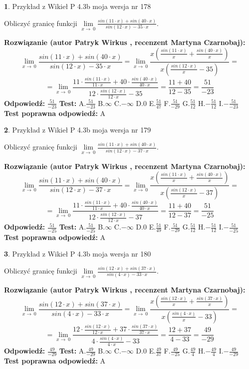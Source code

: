\documentclass[12pt, a4paper]{article}
\theoremstyle{definition} %
\newtheorem{zad}{}
\newcommand{\zadStart}[1]{\begin{zad}#1\newline}
\newcommand{\zadStop}{\end{zad}}
\newcommand{\rozwStart}[2]{\noindent \textbf{Rozwiązanie (autor #1 , recenzent #2): }\newline}
\newcommand{\rozwStop}{\newline}
\newcommand{\odpStart}{\noindent \textbf{Odpowiedź:}\newline}
\newcommand{\odpStop}{\newline}
\newcommand{\testStart}{\noindent \textbf{Test:}\newline}
\newcommand{\testStop}{\newline}
\newcommand{\kluczStart}{\noindent \textbf{Test poprawna odpowiedź:}\newline}
\newcommand{\kluczStop}{\newline}
\begin{document}
\zadStart{Przykład z Wikieł P 4.3b moja wersja nr 178}


Obliczyć granicę funkcji $\lim\limits_{x\to\ 0}\frac{sin(11 \cdot x)+sin(40 \cdot x)}{sin(12 \cdot x)-35 \cdot x}$.
\zadStop
\rozwStart{Patryk Wirkus}{Martyna Czarnobaj}
$$\lim\limits_{x\to\ 0}\frac{sin(11 \cdot x)+sin(40 \cdot x)}{sin(12 \cdot x)-35 \cdot x}=\lim\limits_{x\to\ 0}\frac{x(\frac{sin(11 \cdot x)}{x}+\frac{sin(40 \cdot x)}{x})}{x(\frac{sin(12 \cdot x)}{x}-35)}=$$
$$=\lim\limits_{x\to\ 0}\frac{11 \cdot \frac{sin(11 \cdot x)}{11 \cdot x}+40 \cdot \frac{sin(40 \cdot x)}{40 \cdot x}}{12 \cdot \frac{sin(12 \cdot x)}{12 \cdot x}-35}=\frac{11+40}{12-35} = \frac{51}{-23}$$
\rozwStop
\odpStart
$\frac{51}{-23}$
\odpStop
\testStart
A.$\frac{51}{-23}$
B.$\infty$
C.$-\infty$
D.$0$
E.$\frac{51}{47}$
F.$\frac{51}{-29}$
G.$\frac{51}{12}$
H.$-\frac{51}{12}$
I.$-\frac{51}{-23}$
\testStop
\kluczStart
A
\kluczStop



\zadStart{Przykład z Wikieł P 4.3b moja wersja nr 179}


Obliczyć granicę funkcji $\lim\limits_{x\to\ 0}\frac{sin(11 \cdot x)+sin(40 \cdot x)}{sin(12 \cdot x)-37 \cdot x}$.
\zadStop
\rozwStart{Patryk Wirkus}{Martyna Czarnobaj}
$$\lim\limits_{x\to\ 0}\frac{sin(11 \cdot x)+sin(40 \cdot x)}{sin(12 \cdot x)-37 \cdot x}=\lim\limits_{x\to\ 0}\frac{x(\frac{sin(11 \cdot x)}{x}+\frac{sin(40 \cdot x)}{x})}{x(\frac{sin(12 \cdot x)}{x}-37)}=$$
$$=\lim\limits_{x\to\ 0}\frac{11 \cdot \frac{sin(11 \cdot x)}{11 \cdot x}+40 \cdot \frac{sin(40 \cdot x)}{40 \cdot x}}{12 \cdot \frac{sin(12 \cdot x)}{12 \cdot x}-37}=\frac{11+40}{12-37} = \frac{51}{-25}$$
\rozwStop
\odpStart
$\frac{51}{-25}$
\odpStop
\testStart
A.$\frac{51}{-25}$
B.$\infty$
C.$-\infty$
D.$0$
E.$\frac{51}{49}$
F.$\frac{51}{-29}$
G.$\frac{51}{12}$
H.$-\frac{51}{12}$
I.$-\frac{51}{-25}$
\testStop
\kluczStart
A
\kluczStop



\zadStart{Przykład z Wikieł P 4.3b moja wersja nr 180}


Obliczyć granicę funkcji $\lim\limits_{x\to\ 0}\frac{sin(12 \cdot x)+sin(37 \cdot x)}{sin(4 \cdot x)-33 \cdot x}$.
\zadStop
\rozwStart{Patryk Wirkus}{Martyna Czarnobaj}
$$\lim\limits_{x\to\ 0}\frac{sin(12 \cdot x)+sin(37 \cdot x)}{sin(4 \cdot x)-33 \cdot x}=\lim\limits_{x\to\ 0}\frac{x(\frac{sin(12 \cdot x)}{x}+\frac{sin(37 \cdot x)}{x})}{x(\frac{sin(4 \cdot x)}{x}-33)}=$$
$$=\lim\limits_{x\to\ 0}\frac{12 \cdot \frac{sin(12 \cdot x)}{12 \cdot x}+37 \cdot \frac{sin(37 \cdot x)}{37 \cdot x}}{4 \cdot \frac{sin(4 \cdot x)}{4 \cdot x}-33}=\frac{12+37}{4-33} = \frac{49}{-29}$$
\rozwStop
\odpStart
$\frac{49}{-29}$
\odpStop
\testStart
A.$\frac{49}{-29}$
B.$\infty$
C.$-\infty$
D.$0$
E.$\frac{49}{37}$
F.$\frac{49}{-25}$
G.$\frac{49}{4}$
H.$-\frac{49}{4}$
I.$-\frac{49}{-29}$
\testStop
\kluczStart
A
\kluczStop
\end{document}
